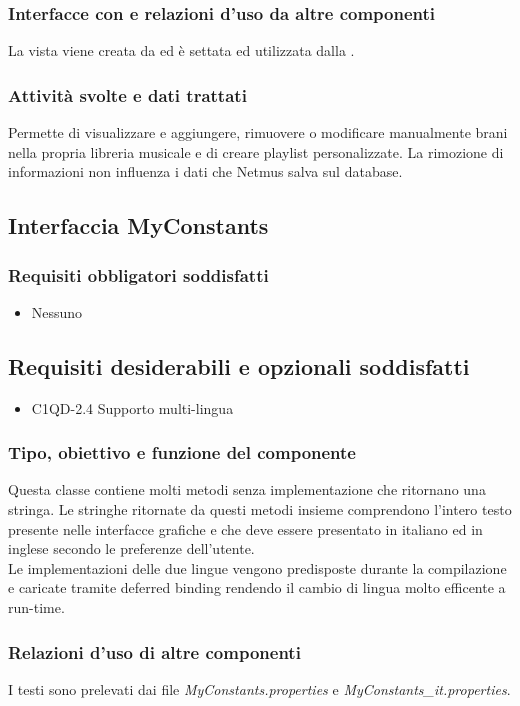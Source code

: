 \subsubsection*{Interfacce con e relazioni d'uso da altre componenti}
La vista viene creata da  ed \`e settata ed utilizzata dalla
.
\subsubsection*{Attivit\`a svolte e dati trattati}
Permette di visualizzare e aggiungere, rimuovere o modificare manualmente brani
nella propria libreria musicale e di creare playlist personalizzate. La
rimozione di informazioni non influenza i dati che Netmus salva sul database.

\subsection{Interfaccia MyConstants}
\subsubsection*{Requisiti obbligatori soddisfatti}
\begin{itemize}
    \item Nessuno
\end{itemize}
\subsection*{Requisiti desiderabili e opzionali soddisfatti}
\begin{itemize}
    \item C1QD-2.4 Supporto multi-lingua
\end{itemize}
\subsubsection*{Tipo, obiettivo e funzione del componente}
Questa classe contiene molti metodi senza implementazione che ritornano una
stringa. Le stringhe ritornate da questi metodi insieme comprendono l'intero
testo presente nelle interfacce grafiche e che deve essere presentato in italiano ed in inglese secondo le
preferenze dell'utente. \\
Le implementazioni delle due lingue vengono predisposte durante la compilazione
e caricate tramite deferred binding rendendo il cambio di lingua molto efficente
a run-time. 
\subsubsection*{Relazioni d'uso di altre componenti}
I testi sono prelevati dai file \emph{MyConstants.properties} e
\emph{MyConstants\_it.properties}. 
